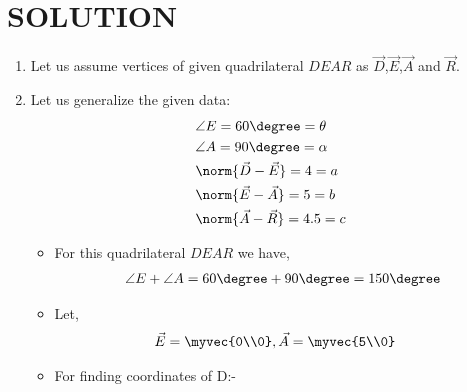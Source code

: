 \documentclass[journal,12pt,twocolumn]{IEEEtran}
\begin{document}
\section{SOLUTION}
\begin{enumerate}
\item Let us assume vertices of given quadrilateral $DEAR$ as $\vec{D}$,$\vec{E}$,$\vec{A}$ and $\vec{R}$.
\item Let us generalize the given data:
    \begin{align}
    &\angle E= 60\degree=\theta \label{eq1}
    \\
    &\angle A= 90\degree=\alpha \label{eq2}
    \\
    &\norm{\vec{D}-\vec{E}} =4=a \label{eq3}
    \\
    &\norm{\vec{E}-\vec{A}} =5=b \label{eq4}
    \\
     &\norm{\vec{A}-\vec{R}} =4.5=c \label{eq5}
    \end{align}
\begin{itemize}
\item For this quadrilateral $DEAR$ we have,
\begin{align}
\angle E +\angle A = 60\degree + 90\degree =150\degree
\end{align}
\item Let, \begin{align}
    &\vec{E}=\myvec{0\\0}, \vec{A}=\myvec{5\\0}
\end{align}
\end{itemize}
\begin{itemize}
\item For finding coordinates of D:-
\end{itemize}

\end{enumerate}
\end{document}
